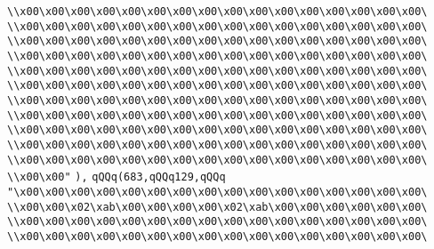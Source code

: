\verb|\\x00\x00\x00\x00\x00\x00\x00\x00\x00\x00\x00\x00\x00\x00\x00\x00\|\newline
\verb|\\x00\x00\x00\x00\x00\x00\x00\x00\x00\x00\x00\x00\x00\x00\x00\x00\|\newline
\verb|\\x00\x00\x00\x00\x00\x00\x00\x00\x00\x00\x00\x00\x00\x00\x00\x00\|\newline
\verb|\\x00\x00\x00\x00\x00\x00\x00\x00\x00\x00\x00\x00\x00\x00\x00\x00\|\newline
\verb|\\x00\x00\x00\x00\x00\x00\x00\x00\x00\x00\x00\x00\x00\x00\x00\x00\|\newline
\verb|\\x00\x00\x00\x00\x00\x00\x00\x00\x00\x00\x00\x00\x00\x00\x00\x00\|\newline
\verb|\\x00\x00\x00\x00\x00\x00\x00\x00\x00\x00\x00\x00\x00\x00\x00\x00\|\newline
\verb|\\x00\x00\x00\x00\x00\x00\x00\x00\x00\x00\x00\x00\x00\x00\x00\x00\|\newline
\verb|\\x00\x00\x00\x00\x00\x00\x00\x00\x00\x00\x00\x00\x00\x00\x00\x00\|\newline
\verb|\\x00\x00\x00\x00\x00\x00\x00\x00\x00\x00\x00\x00\x00\x00\x00\x00\|\newline
\verb|\\x00\x00\x00\x00\x00\x00\x00\x00\x00\x00\x00\x00\x00\x00\x00\x00\|\newline
\verb|\\x00\x00"|\newline
\verb|),|\newline
\verb|qQQq(683,qQQq129,qQQq|\newline
\verb|"\x00\x00\x00\x00\x00\x00\x00\x00\x00\x00\x00\x00\x00\x00\x00\x00\|\newline
\verb|\\x00\x00\x02\xab\x00\x00\x00\x00\x02\xab\x00\x00\x00\x00\x00\x00\|\newline
\verb|\\x00\x00\x00\x00\x00\x00\x00\x00\x00\x00\x00\x00\x00\x00\x00\x00\|\newline
\verb|\\x00\x00\x00\x00\x00\x00\x00\x00\x00\x00\x00\x00\x00\x00\x00\x00\|\newline
